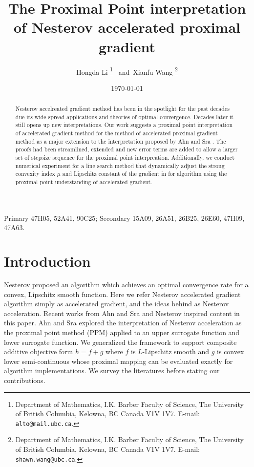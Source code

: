 \documentclass[12pt]{article}
\begin{document}
\title{{\selectfont The Proximal Point interpretation of Nesterov accelerated proximal gradient}}

\author{
    Hongda Li
    \thanks{Department of Mathematics, I.K. Barber Faculty of Science,
    The University of British Columbia, Kelowna, BC Canada V1V 1V7. E-mail:  \texttt{alto@mail.ubc.ca}.}~ and~Xianfu Wang
    \thanks{Department of Mathematics, I.K. Barber Faculty of Science,
    The University of British Columbia, Kelowna, BC Canada V1V 1V7. E-mail:  \texttt{shawn.wang@ubc.ca}.}
}

\date{\today}

\maketitle


\begin{abstract} 
    \noindent
    Nesterov accelreated gradient method has been in the spotlight for the past decades due its wide spread applications and theories of optimal convergence. 
    Decades later it still opens up new interpretations. 
    Our work suggests a proximal point interpretation of accelerated gradient method for the method of accelerated proximal gradient method as a major extension to the interpretation proposed by Ahn and Sra \cite{ahn_understanding_2022}. 
    The proofs had been streamlined, extended and new error terms are added to allow a larger set of stepsize sequence for the proximal point interpreation. 
    Additionally, we conduct numerical experiment for a line search method that dynamically adjust the strong convexity index $\mu$ and Lipschitz constant of the gradient in for algorithm  using the proximal point understanding of accelerated gradient. 
    
\end{abstract}

Primary 47H05, 52A41, 90C25; Secondary 15A09, 26A51, 26B25, 26E60, 47H09, 47A63.

\section{Introduction}
    
    Nesterov \cite{nesterov_method_1983} proposed an algorithm which achieves an optimal convergence rate for a convex, Lipschitz smooth function. 
    Here we refer Nesterov accelerated gradient algorithm simply as accelerated gradient, and the ideas behind as Nesterov acceleration. 
    Recent works from Ahn and Sra \cite{ahn_understanding_2022} and Nesterov \cite{nesterov_lectures_2018} inspired content in this paper.
    Ahn and Sra explored the interpretation of Nesterov acceleration as the proximal point method (PPM) applied to an upper surrogate function and lower surrogate function. 
    We generalized the framework to support composite additive objective form $h = f + g$ where $f$ is $L$-Lipschitz smooth and $g$ is convex lower semi-continuous whose proximal mapping can be evaluated exactly for algorithm implementations. 
    We survey the literatures before stating our contributions. 
    
\end{document}
